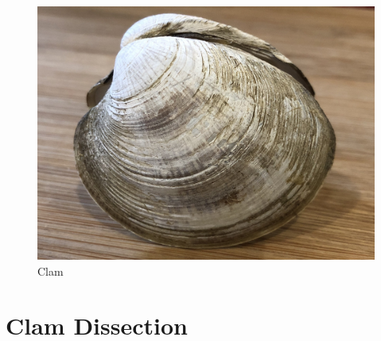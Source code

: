 \begin{figure}

{\centering \includegraphics[width=0.7\linewidth]{./figures/rotifera/clam}

}

\caption{Clam}\label{fig:clam}
\end{figure}

\section{Clam Dissection}\label{clam-dissection}

